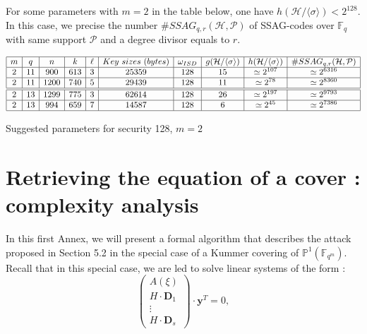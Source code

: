 \documentclass[10pt]{article}
\newcommand{\s}{\vspace{0.3cm}}
\newcommand{\cd}{\cdot}
\newcommand{\calH}{\mathcal{H}}
\newcommand{\fqm}{\mathbb{F}_{q^m}}
\newcommand{\fq}{\mathbb{F}_q}
\newcommand{\w}{\omega}
\newcommand{\PR}{\mathcal{P}}
\begin{document}
\s

For some parameters with $m=2$ in the table below, one have $h(\calH/\langle \sigma \rangle) < 2^{128}$. In this case, we precise the number $\#SSAG_{q,r}(\mathcal{H},\PR)$ of SSAG-codes over $\fq$ with same support $\PR$ and a degree divisor equals to $r$.

\s


\begin{table}[htbp]
\begin{equation*}
\begin{array}{|c|c|c|c|c|c|c|c|c|c|}
\hline
m & q  & n & k & \ell & Key \ sizes \ (bytes) & \w_{ISD} & g(\calH/\langle \sigma \rangle) & h(\calH/\langle \sigma \rangle) & \#SSAG_{q,r}(\mathcal{H},\PR)  \\
\hline
2 & 11  & 900 & 613 & 3 & 25359 & 128 & 15 & \simeq 2^{107} & \simeq 2^{6316} \\
\hline
2 & 11  & 1200 & 740 & 5 & 29439 & 128 & 11 & \simeq 2^{78} & \simeq 2^{8360}\\
\hline \hline
2 & 13  & 1299 & 775 & 3 & 62614 & 128 & 26 & \simeq 2^{197} & \simeq 2^{9793}\\
\hline
2 & 13 & 994 & 659 & 7 & 14587 & 128 & 6 & \simeq 2^{45} & \simeq 2^{7386}\\
\hline
\end{array}
\end{equation*}
\caption{Suggested parameters for security 128, $m = 2$}
\end{table}


\newpage

\appendix

\section{Retrieving the equation of a cover : complexity analysis}

\s

In this first Annex, we will present a formal algorithm that describes the attack proposed in Section 5.2 in the special case of a Kummer covering of $\mathbb{P}^1(\fqm)$. Recall that in this special case, we are led to solve linear systems of the form :
\begin{equation} \tag{$\Delta(\xi)$}
\begin{pmatrix}
A(\xi) \\
H \cd \textbf{D}_1 \\
\vdots \\
H \cd \textbf{D}_s
\end{pmatrix}
\cd \textbf{y}^T = 0,
\end{equation}
\s
\end{document}
